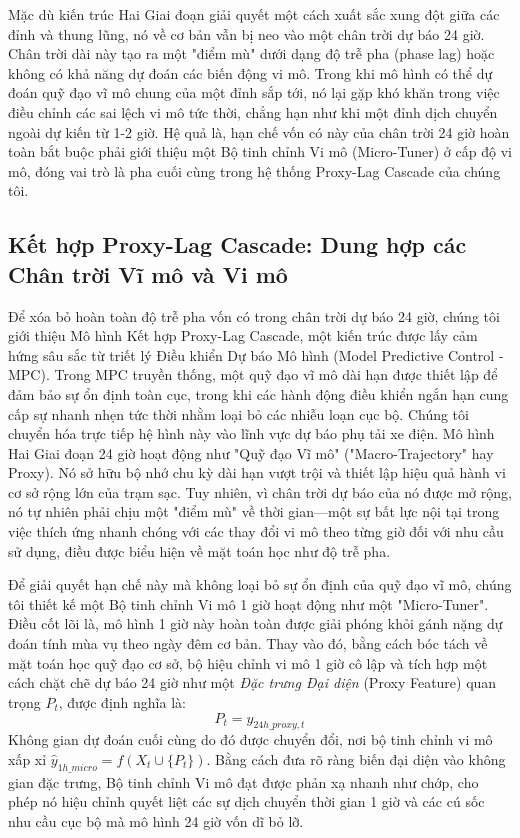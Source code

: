 \documentclass[pdflatex,sn-mathphys-num]{sn-jnl}%
\theoremstyle{thmstyleone}%
\theoremstyle{thmstyletwo}%
\theoremstyle{thmstylethree}%
\begin{document}
Mặc dù kiến trúc Hai Giai đoạn giải quyết một cách xuất sắc xung đột giữa các đỉnh và thung lũng, nó về cơ bản vẫn bị neo vào một chân trời dự báo 24 giờ. Chân trời dài này tạo ra một "điểm mù" dưới dạng độ trễ pha (phase lag) hoặc không có khả năng dự đoán các biến động vi mô. Trong khi mô hình có thể dự đoán quỹ đạo vĩ mô chung của một đỉnh sắp tới, nó lại gặp khó khăn trong việc điều chỉnh các sai lệch vi mô tức thời, chẳng hạn như khi một đỉnh dịch chuyển ngoài dự kiến từ 1-2 giờ. Hệ quả là, hạn chế vốn có này của chân trời 24 giờ hoàn toàn bắt buộc phải giới thiệu một Bộ tinh chỉnh Vi mô (Micro-Tuner) ở cấp độ vi mô, đóng vai trò là pha cuối cùng trong hệ thống Proxy-Lag Cascade của chúng tôi.

\subsection{Kết hợp Proxy-Lag Cascade: Dung hợp các Chân trời Vĩ mô và Vi mô}\label{subsec2_5}

Để xóa bỏ hoàn toàn độ trễ pha vốn có trong chân trời dự báo 24 giờ, chúng tôi giới thiệu Mô hình Kết hợp Proxy-Lag Cascade, một kiến trúc được lấy cảm hứng sâu sắc từ triết lý Điều khiển Dự báo Mô hình (Model Predictive Control - MPC). Trong MPC truyền thống, một quỹ đạo vĩ mô dài hạn được thiết lập để đảm bảo sự ổn định toàn cục, trong khi các hành động điều khiển ngắn hạn cung cấp sự nhanh nhẹn tức thời nhằm loại bỏ các nhiễu loạn cục bộ. Chúng tôi chuyển hóa trực tiếp hệ hình này vào lĩnh vực dự báo phụ tải xe điện. Mô hình Hai Giai đoạn 24 giờ hoạt động như "Quỹ đạo Vĩ mô" ("Macro-Trajectory" hay Proxy). Nó sở hữu bộ nhớ chu kỳ dài hạn vượt trội và thiết lập hiệu quả hành vi cơ sở rộng lớn của trạm sạc. Tuy nhiên, vì chân trời dự báo của nó được mở rộng, nó tự nhiên phải chịu một "điểm mù" về thời gian---một sự bất lực nội tại trong việc thích ứng nhanh chóng với các thay đổi vi mô theo từng giờ đối với nhu cầu sử dụng, điều được biểu hiện về mặt toán học như độ trễ pha.

Để giải quyết hạn chế này mà không loại bỏ sự ổn định của quỹ đạo vĩ mô, chúng tôi thiết kế một Bộ tinh chỉnh Vi mô 1 giờ hoạt động như một "Micro-Tuner". Điều cốt lõi là, mô hình 1 giờ này hoàn toàn được giải phóng khỏi gánh nặng dự đoán tính mùa vụ theo ngày đêm cơ bản. Thay vào đó, bằng cách bóc tách về mặt toán học quỹ đạo cơ sở, bộ hiệu chỉnh vi mô 1 giờ cô lập và tích hợp một cách chặt chẽ dự báo 24 giờ như một \textit{Đặc trưng Đại diện} (Proxy Feature) quan trọng $P_t$, được định nghĩa là:
\begin{equation}
P_t = \hat{y}_{24h\_proxy, t}
\end{equation}
Không gian dự đoán cuối cùng do đó được chuyển đổi, nơi bộ tinh chỉnh vi mô xấp xỉ $\hat{y}_{1h\_micro} = f(X_t \cup \{P_t\})$. Bằng cách đưa rõ ràng biến đại diện vào không gian đặc trưng, Bộ tinh chỉnh Vi mô đạt được phản xạ nhanh như chớp, cho phép nó hiệu chỉnh quyết liệt các sự dịch chuyển thời gian 1 giờ và các cú sốc nhu cầu cục bộ mà mô hình 24 giờ vốn dĩ bỏ lỡ.
\end{document}
